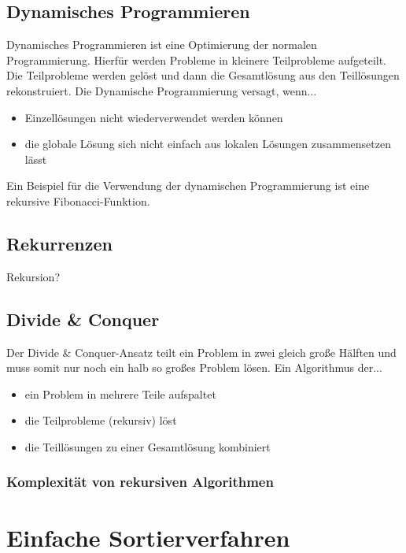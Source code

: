 \documentclass[12pt,a4paper]{article}
\begin{document}
\subsection{Dynamisches Programmieren}
Dynamisches Programmieren ist eine Optimierung der normalen Programmierung. Hierfür werden Probleme in kleinere Teilprobleme aufgeteilt. Die Teilprobleme werden gelöst und dann die Gesamtlösung aus den Teillösungen rekonstruiert.\newline
Die Dynamische Programmierung versagt, wenn...
\vspace{.35cm}
\begin{itemize}
	\item Einzellösungen nicht wiederverwendet werden können
	\item die globale Lösung sich nicht einfach aus lokalen Lösungen zusammensetzen lässt
\end{itemize}
\vspace{.35cm}
Ein Beispiel für die Verwendung der dynamischen Programmierung ist eine rekursive Fibonacci-Funktion.

\subsection{Rekurrenzen}
Rekursion?

\subsection{Divide \& Conquer}
Der Divide \& Conquer-Ansatz teilt ein Problem in zwei gleich große Hälften und muss somit nur noch ein halb so großes Problem lösen.\newline
Ein Algorithmus der...
\begin{itemize}
	\item ein Problem in mehrere Teile aufspaltet
	\item die Teilprobleme (rekursiv) löst
	\item die Teillösungen zu einer Gesamtlösung kombiniert
\end{itemize}

\subsubsection{Komplexität von rekursiven Algorithmen}


\section{Einfache Sortierverfahren}
\end{document}
